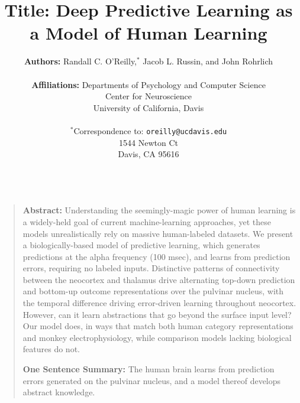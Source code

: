 \documentclass[12pt,twoside]{article}
\title{ {\bf Title:} Deep Predictive Learning as a Model of Human Learning }
\author{{\bf Authors:} Randall C. O'Reilly,$^\ast$ Jacob L. Russin, and John Rohrlich\\
\vspace{.15in}\\
  {\bf Affiliations:} Departments of Psychology and Computer Science\\
  Center for Neuroscience\\
  University of California, Davis \\
  \vspace{.15in}\\
  $^\ast$Correspondence to: \texttt{oreilly@ucdavis.edu}\\
  1544 Newton Ct\\
  Davis, CA 95616\\
  \\}
\newif\myifpdf
\newenvironment{sciabstract}{%
\begin{quote}}
{\end{quote}}
\begin{document}
\sloppy
\raggedbottom

\maketitle 

\begin{sciabstract}
{\bf Abstract:} Understanding the seemingly-magic power of human learning is a widely-held goal of current machine-learning approaches, yet these models unrealistically rely on massive human-labeled datasets.  We present a biologically-based model of predictive learning, which generates predictions at the alpha frequency (100 msec), and learns from prediction errors, requiring no labeled inputs.  Distinctive patterns of connectivity between the neocortex and thalamus drive alternating top-down prediction and bottom-up outcome representations over the pulvinar nucleus, with the temporal difference driving error-driven learning throughout neocortex.  However, can it learn abstractions that go beyond the surface input level?  Our model does, in ways that match both human category representations and monkey electrophysiology, while comparison models lacking biological features do not.


{\bf One Sentence Summary:} The human brain learns from prediction errors generated on the pulvinar nucleus, and a model thereof develops abstract knowledge.

\end{sciabstract}



\clearpage

\pagestyle{myheadings}

\end{document}
